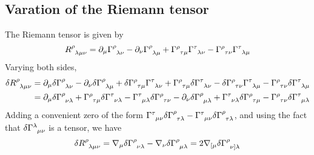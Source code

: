 \subsection{Varation of the Riemann tensor}
The Riemann tensor is given by
\begin{equation*}
    \tensor{R}{^\rho_{\lambda\mu\nu}}=\partial_\mu\tensor{\Gamma}{^\rho_{\lambda\nu}}-\partial_\nu\tensor{\Gamma}{^\rho_{\lambda\mu}}+\tensor{\Gamma}{^\rho_{\tau\mu}}\tensor{\Gamma}{^\tau_{\lambda\nu}}-\tensor{\Gamma}{^\rho_{\tau\nu}}\tensor{\Gamma}{^\tau_{\lambda\mu}}
\end{equation*}
Varying both sides,
\begin{align*}
    \delta  \tensor{R}{^\rho_{\lambda\mu\nu}}&=\partial_\mu\delta\tensor{\Gamma}{^\rho_{\lambda\nu}}-\partial_\nu\delta\tensor{\Gamma}{^\rho_{\lambda\mu}}+\delta\tensor{\Gamma}{^\rho_{\tau\mu}}\tensor{\Gamma}{^\tau_{\lambda\nu}}+\tensor{\Gamma}{^\rho_{\tau\mu}}\delta\tensor{\Gamma}{^\tau_{\lambda\nu}}-\delta\tensor{\Gamma}{^\rho_{\tau\nu}}\tensor{\Gamma}{^\tau_{\lambda\mu}}-\tensor{\Gamma}{^\rho_{\tau\nu}}\delta\tensor{\Gamma}{^\tau_{\lambda\mu}}\\
    &=\partial_\mu\delta\tensor{\Gamma}{^\rho_{\nu\lambda}}+\tensor{\Gamma}{^\rho_{\tau\mu}}\delta\tensor{\Gamma}{^\tau_{\nu\lambda}}-\tensor{\Gamma}{^\tau_{\mu\lambda}}\delta\tensor{\Gamma}{^\rho_{\tau\nu}}-\partial_\nu\delta\tensor{\Gamma}{^\rho_{\mu\lambda}}+\tensor{\Gamma}{^\tau_{\nu\lambda}}\delta\tensor{\Gamma}{^\rho_{\tau\mu}}-\tensor{\Gamma}{^\rho_{\tau\nu}}\delta\tensor{\Gamma}{^\tau_{\mu\lambda}}
\end{align*}
Adding a convenient zero of the form $\tensor{\Gamma}{^\tau_{\mu\nu}}\delta\tensor{\Gamma}{^\rho_{\tau\lambda}}-\tensor{\Gamma}{^\tau_{\mu\nu}}\delta\tensor{\Gamma}{^\rho_{\tau\lambda}}$, and using the fact that $\delta\tensor{\Gamma}{^\lambda_{\mu\nu}}$ is a tensor, we have
\begin{equation}
    \delta\tensor{R}{^\rho_{\lambda\mu\nu}}=\nabla_\mu\delta\tensor{\Gamma}{^\rho_{\nu\lambda}}-\nabla_\nu\delta\tensor{\Gamma}{^\rho_{\mu\lambda}}=2\nabla_{[\mu}\delta\tensor{\Gamma}{^\rho_{\nu]\lambda}}\label{delta Riemann}
\end{equation}




